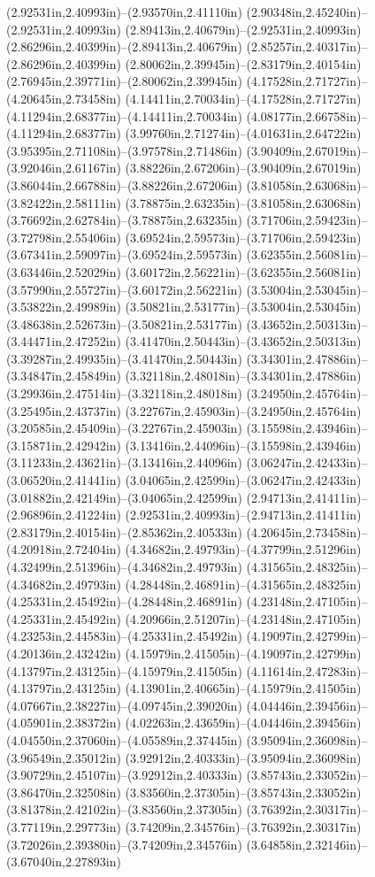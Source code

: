 (2.92531in,2.40993in)--(2.93570in,2.41110in) (2.90348in,2.45240in)--(2.92531in,2.40993in) (2.89413in,2.40679in)--(2.92531in,2.40993in) (2.86296in,2.40399in)--(2.89413in,2.40679in) (2.85257in,2.40317in)--(2.86296in,2.40399in) (2.80062in,2.39945in)--(2.83179in,2.40154in) (2.76945in,2.39771in)--(2.80062in,2.39945in) (4.17528in,2.71727in)--(4.20645in,2.73458in) (4.14411in,2.70034in)--(4.17528in,2.71727in) (4.11294in,2.68377in)--(4.14411in,2.70034in) (4.08177in,2.66758in)--(4.11294in,2.68377in) (3.99760in,2.71274in)--(4.01631in,2.64722in) (3.95395in,2.71108in)--(3.97578in,2.71486in) (3.90409in,2.67019in)--(3.92046in,2.61167in) (3.88226in,2.67206in)--(3.90409in,2.67019in) (3.86044in,2.66788in)--(3.88226in,2.67206in) (3.81058in,2.63068in)--(3.82422in,2.58111in) (3.78875in,2.63235in)--(3.81058in,2.63068in) (3.76692in,2.62784in)--(3.78875in,2.63235in) (3.71706in,2.59423in)--(3.72798in,2.55406in) (3.69524in,2.59573in)--(3.71706in,2.59423in) (3.67341in,2.59097in)--(3.69524in,2.59573in) (3.62355in,2.56081in)--(3.63446in,2.52029in) (3.60172in,2.56221in)--(3.62355in,2.56081in) (3.57990in,2.55727in)--(3.60172in,2.56221in) (3.53004in,2.53045in)--(3.53822in,2.49989in) (3.50821in,2.53177in)--(3.53004in,2.53045in) (3.48638in,2.52673in)--(3.50821in,2.53177in) (3.43652in,2.50313in)--(3.44471in,2.47252in) (3.41470in,2.50443in)--(3.43652in,2.50313in) (3.39287in,2.49935in)--(3.41470in,2.50443in) (3.34301in,2.47886in)--(3.34847in,2.45849in) (3.32118in,2.48018in)--(3.34301in,2.47886in) (3.29936in,2.47514in)--(3.32118in,2.48018in) (3.24950in,2.45764in)--(3.25495in,2.43737in) (3.22767in,2.45903in)--(3.24950in,2.45764in) (3.20585in,2.45409in)--(3.22767in,2.45903in) (3.15598in,2.43946in)--(3.15871in,2.42942in) (3.13416in,2.44096in)--(3.15598in,2.43946in) (3.11233in,2.43621in)--(3.13416in,2.44096in) (3.06247in,2.42433in)--(3.06520in,2.41441in) (3.04065in,2.42599in)--(3.06247in,2.42433in) (3.01882in,2.42149in)--(3.04065in,2.42599in) (2.94713in,2.41411in)--(2.96896in,2.41224in) (2.92531in,2.40993in)--(2.94713in,2.41411in) (2.83179in,2.40154in)--(2.85362in,2.40533in) (4.20645in,2.73458in)--(4.20918in,2.72404in) (4.34682in,2.49793in)--(4.37799in,2.51296in) (4.32499in,2.51396in)--(4.34682in,2.49793in) (4.31565in,2.48325in)--(4.34682in,2.49793in) (4.28448in,2.46891in)--(4.31565in,2.48325in) (4.25331in,2.45492in)--(4.28448in,2.46891in) (4.23148in,2.47105in)--(4.25331in,2.45492in) (4.20966in,2.51207in)--(4.23148in,2.47105in) (4.23253in,2.44583in)--(4.25331in,2.45492in) (4.19097in,2.42799in)--(4.20136in,2.43242in) (4.15979in,2.41505in)--(4.19097in,2.42799in) (4.13797in,2.43125in)--(4.15979in,2.41505in) (4.11614in,2.47283in)--(4.13797in,2.43125in) (4.13901in,2.40665in)--(4.15979in,2.41505in) (4.07667in,2.38227in)--(4.09745in,2.39020in) (4.04446in,2.39456in)--(4.05901in,2.38372in) (4.02263in,2.43659in)--(4.04446in,2.39456in) (4.04550in,2.37060in)--(4.05589in,2.37445in) (3.95094in,2.36098in)--(3.96549in,2.35012in) (3.92912in,2.40333in)--(3.95094in,2.36098in) (3.90729in,2.45107in)--(3.92912in,2.40333in) (3.85743in,2.33052in)--(3.86470in,2.32508in) (3.83560in,2.37305in)--(3.85743in,2.33052in) (3.81378in,2.42102in)--(3.83560in,2.37305in) (3.76392in,2.30317in)--(3.77119in,2.29773in) (3.74209in,2.34576in)--(3.76392in,2.30317in) (3.72026in,2.39380in)--(3.74209in,2.34576in) (3.64858in,2.32146in)--(3.67040in,2.27893in) 